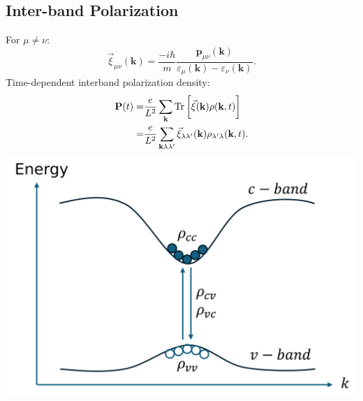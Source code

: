 \documentclass{beamer}
\begin{document}
\subsection{Inter-band Polarization}
\begin{frame}
		\begin{multicols}{2}
For $\mu \neq \nu$:
			\begin{equation}
\vec{\xi}_{\mu\nu}(\textbf{k}) = \frac{-i\hbar}{m}\frac{\textbf{p}_{\mu\nu}(\textbf{k})}{\varepsilon_{\mu}(\textbf{k}) - \varepsilon_{\nu}(\textbf{k})}.
			\end{equation}
Time-dependent interband polarization density:
	\begin{align}
		\textbf{P}(t) = &\frac{e}{L^2} \sum_{\textbf{k}} \Tr\bigg[\vec{\xi}(\textbf{k})\rho(\textbf{k},t)\bigg]\nonumber\\
		= &\frac{e}{L^2} \sum_{\textbf{k}\lambda\lambda'}\vec{\xi}_{\lambda\lambda'}(\textbf{k})\rho_{\lambda'\lambda}(\textbf{k},t).
	\end{align}
			\columnbreak
			\includegraphics[width=0.8\linewidth]{images/cvbeamer.pdf}
		\end{multicols}
	\end{frame}
\end{document}
